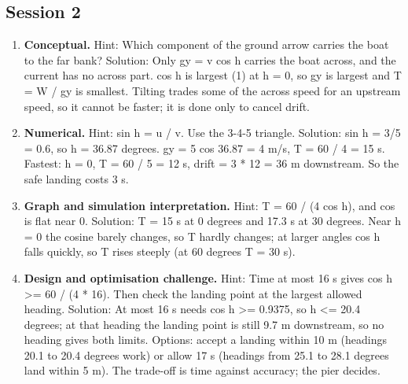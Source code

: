 \documentclass[11pt,a4paper]{article}
\begin{document}
\subsection*{Session 2}
\begin{enumerate}[nosep]
\item \textbf{Conceptual.} Hint: Which component of the ground arrow carries the boat to the far bank? Solution: Only gy = v cos h carries the boat across, and the current has no across part. cos h is largest (1) at h = 0, so gy is largest and T = W / gy is smallest. Tilting trades some of the across speed for an upstream speed, so it cannot be faster; it is done only to cancel drift.
\item \textbf{Numerical.} Hint: sin h = u / v. Use the 3-4-5 triangle. Solution: sin h = 3/5 = 0.6, so h = 36.87 degrees. gy = 5 cos 36.87 = 4 m/s, T = 60 / 4 = 15 s. Fastest: h = 0, T = 60 / 5 = 12 s, drift = 3 * 12 = 36 m downstream. So the safe landing costs 3 s.
\item \textbf{Graph and simulation interpretation.} Hint: T = 60 / (4 cos h), and cos is flat near 0. Solution: T = 15 s at 0 degrees and 17.3 s at 30 degrees. Near h = 0 the cosine barely changes, so T hardly changes; at larger angles cos h falls quickly, so T rises steeply (at 60 degrees T = 30 s).
\item \textbf{Design and optimisation challenge.} Hint: Time at most 16 s gives cos h \textgreater{}= 60 / (4 * 16). Then check the landing point at the largest allowed heading. Solution: At most 16 s needs cos h \textgreater{}= 0.9375, so h \textless{}= 20.4 degrees; at that heading the landing point is still 9.7 m downstream, so no heading gives both limits. Options: accept a landing within 10 m (headings 20.1 to 20.4 degrees work) or allow 17 s (headings from 25.1 to 28.1 degrees land within 5 m). The trade-off is time against accuracy; the pier decides.
\end{enumerate}
\end{document}
